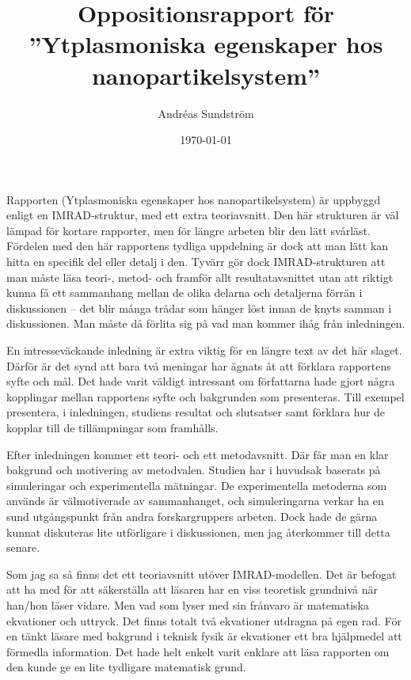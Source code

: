 \documentclass[11pt,a4paper, english, swedish
]{article}
\begin{document}
\title{Oppositionsrapport för
\\\Large ''Ytplasmoniska egenskaper hos nanopartikelsystem'' }
\author{Andréas Sundström}
\date{\today}

\maketitle




\noindent
Rapporten (Ytplasmoniska egenskaper hos nanopartikelsystem) är uppbyggd enligt en IMRAD-struktur, med ett extra teoriavsnitt. Den här strukturen är väl lämpad för kortare rapporter, men för längre arbeten blir den lätt svårläst. Fördelen med den här rapportens tydliga uppdelning är dock att man lätt kan hitta en specifik del eller detalj i den. 
Tyvärr gör dock IMRAD-strukturen att man måste läsa teori-, metod- och framför allt resultatavsnittet utan att riktigt kunna få ett sammanhang mellan de olika delarna och detaljerna förrän i diskussionen -- det blir många trådar som hänger löst innan de knyts samman i diskussionen. Man måste då förlita sig på vad man kommer ihåg från inledningen. 

En intresseväckande inledning är extra viktig för en längre text av det här slaget. Därför är det synd att bara två meningar har ägnats åt att förklara rapportens syfte och mål. Det hade varit väldigt intressant om författarna hade gjort några kopplingar mellan rapportens syfte och bakgrunden som presenteras. Till exempel presentera, i inledningen, studiens resultat och slutsatser samt förklara hur de kopplar till de tillämpningar som framhålls.

Efter inledningen kommer ett teori- och ett metodavsnitt. Där får man en klar bakgrund och motivering av metodvalen. Studien har i huvudsak baserats på simuleringar och experimentella mätningar. De experimentella metoderna som används är välmotiverade av sammanhanget, och simuleringarna verkar ha en sund utgångspunkt från andra forskargruppers arbeten.
Dock hade de gärna kunnat diskuteras lite utförligare i diskussionen, men jag återkommer till detta senare. 

Som jag sa så finns det ett teoriavsnitt utöver IMRAD-modellen. Det är befogat att ha med för att säkerställa att läsaren har en viss teoretisk grundnivå när han/hon läser vidare. Men vad som lyser med sin frånvaro är matematiska ekvationer och uttryck. Det finns totalt två ekvationer utdragna på egen rad. För en tänkt läsare med bakgrund i teknisk fysik är ekvationer ett bra hjälpmedel att förmedla information. Det hade helt enkelt varit enklare att läsa rapporten om den kunde ge en lite tydligare matematisk grund.
\end{document}
